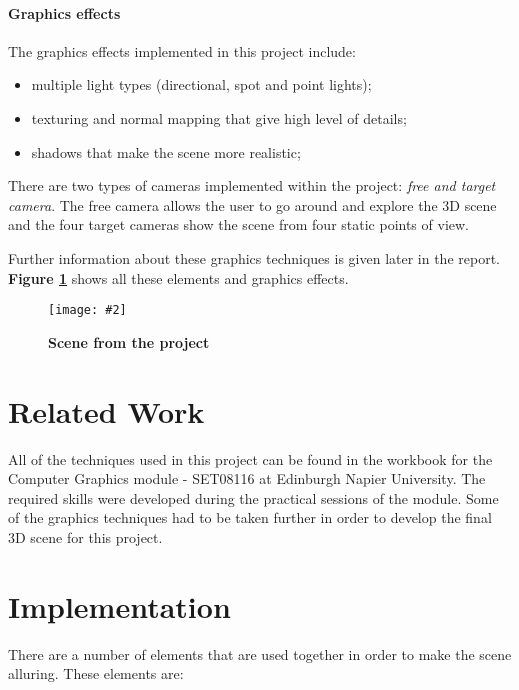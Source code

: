 \documentclass[10pt, a4paper]{article}
\newcommand{\figuremacro}[5]{
    \begin{figure}[#1]
        \centering
        \texttt{[image: \#2]}
        \caption[#3]{\textbf{#3}#4}
        \label{fig:#2}
    \end{figure}
}
\begin{document}
    
	\paragraph{Graphics effects}The graphics effects implemented in this project include:
	\begin{itemize}
		\item multiple light types (directional, spot and point lights);
		\item texturing and normal mapping that give high level of details;
		\item shadows that make the scene more realistic;
	\end{itemize}
    There are two types of cameras implemented within the project: \textit{free and target camera}. The free camera allows the user to go around and explore the 3D scene and the four target cameras show the scene from four static points of view.
    
    Further information about these graphics techniques is given later in the report. \textbf{Figure {\ref{fig:general}}} shows all these elements and graphics effects.
	\figuremacro{h}{general}{Scene from the project}{ }{1.0}
	
	\section{Related Work}

	All of the techniques used in this project can be found in the workbook for the Computer Graphics module - SET08116 at Edinburgh Napier University\cite{book}. The required skills were developed during the practical sessions of the module. Some of the graphics techniques had to be taken further in order to develop the final 3D scene for this project.

	\section{Implementation}
		
	There are a number of elements that are used together in order to make the scene alluring. These elements are:
\end{document}
